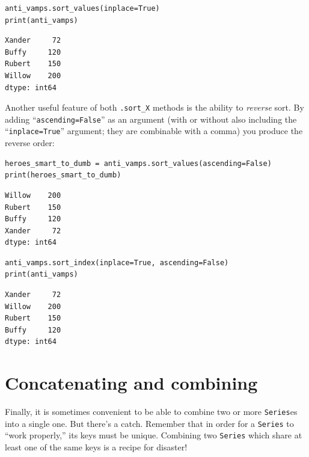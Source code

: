 \begin{Verbatim}[fontsize=\small,samepage=true,frame=single,framesep=3mm]
anti_vamps.sort_values(inplace=True)
print(anti_vamps)
\end{Verbatim}
\vspace{-.3in}

\begin{Verbatim}[fontsize=\small,samepage=true,frame=leftline,framesep=5mm,framerule=1mm]
Xander     72
Buffy     120
Rubert    150
Willow    200
dtype: int64
\end{Verbatim}

Another useful feature of both \texttt{.sort\_X} methods is the ability to
\textit{reverse} sort. By adding ``\texttt{ascending=False}'' as an argument
(with or without also including the ``\texttt{inplace=True}'' argument; they
are combinable with a comma) you produce the reverse order:

\begin{Verbatim}[fontsize=\small,samepage=true,frame=single,framesep=3mm]
heroes_smart_to_dumb = anti_vamps.sort_values(ascending=False)
print(heroes_smart_to_dumb)
\end{Verbatim}
\vspace{-.3in}

\begin{Verbatim}[fontsize=\small,samepage=true,frame=leftline,framesep=5mm,framerule=1mm]
Willow    200
Rubert    150
Buffy     120
Xander     72
dtype: int64
\end{Verbatim}

\begin{Verbatim}[fontsize=\small,samepage=true,frame=single,framesep=3mm]
anti_vamps.sort_index(inplace=True, ascending=False)
print(anti_vamps)
\end{Verbatim}
\vspace{-.3in}

\begin{Verbatim}[fontsize=\small,samepage=true,frame=leftline,framesep=5mm,framerule=1mm]
Xander     72
Willow    200
Rubert    150
Buffy     120
dtype: int64
\end{Verbatim}

\section{Concatenating and combining}

Finally, it is sometimes convenient to be able to combine two or more
\texttt{Series}es into a single one. But there's a catch. Remember that in
order for a \texttt{Series} to ``work properly,'' its keys must be unique.
Combining two \texttt{Series} which share at least one of the same keys is a
recipe for disaster!

